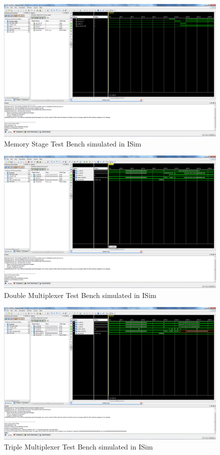 \begin{figure}
    \includegraphics[width=\textwidth]{illustrations/tb_mem_stage.PNG}
    \caption{Memory Stage Test Bench simulated in ISim}
\end{figure}

\begin{figure}
    \includegraphics[width=\textwidth]{illustrations/tb_mux2.PNG}
    \caption{Double Multiplexer Test Bench simulated in ISim}
\end{figure}

\begin{figure}
    \includegraphics[width=\textwidth]{illustrations/tb_mux3.PNG}
    \caption{Triple Multiplexer Test Bench simulated in ISim}
\end{figure}

